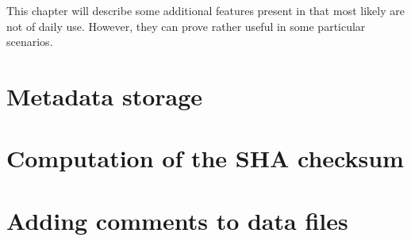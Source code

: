 This chapter will describe some additional features present in \progname that
most likely are not of daily use. However, they can prove rather useful in some
particular scenarios.

\section{Metadata storage}
\label{sec:metadata}

\section{Computation of the SHA checksum}

\section{Adding comments to data files}
